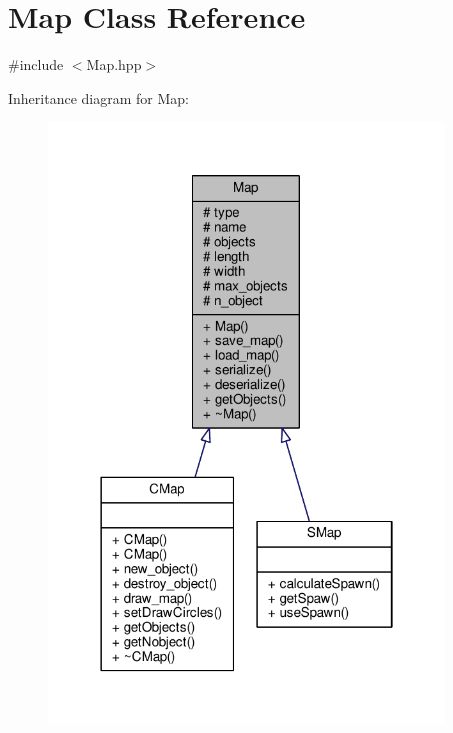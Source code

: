 \hypertarget{class_map}{}\section{Map Class Reference}
\label{class_map}


{\ttfamily \#include $<$Map.\+hpp$>$}



Inheritance diagram for Map\+:\nopagebreak
\begin{figure}[H]
\begin{center}
\leavevmode
\includegraphics[width=298pt]{class_map__inherit__graph}
\end{center}
\end{figure}


